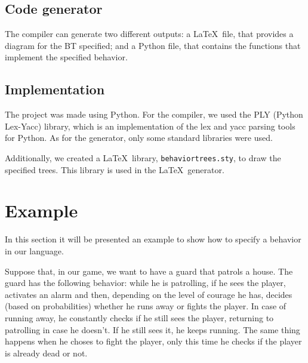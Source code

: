 \documentclass[a4paper,UKenglish,cleveref, autoref, thm-restate]{oasics-v2019}
\begin{document}
\subsection{Code generator}
The compiler can generate two different outputs: a \LaTeX\ file, that provides a diagram for the BT specified; and a Python file, that contains the functions that implement the specified behavior.


\subsection{Implementation}

The project was made using Python.
For the compiler, we used the PLY (Python Lex-Yacc) library, which is an implementation of the lex and yacc parsing tools for Python.
As for the generator, only some standard libraries were used.


Additionally, we created a \LaTeX\ library, \texttt{behaviortrees.sty}, to draw the specified trees. This library is used in the \LaTeX\ generator.

\section{Example}
\label{sec:example}
In this section it will be presented an example to show how to specify a behavior in our language.

Suppose that, in our game, we want to have a guard that patrols a house.
The guard has the following behavior: while he is patrolling, if he sees the player, activates an alarm and then, depending on the level of courage he has, decides (based on probabilities) whether he runs away or fights the player.
In case of running away, he constantly checks if he still sees the player, returning to patrolling in case he doesn't. If he still sees it, he keeps running.
The same thing happens when he choses to fight the player, only this time he checks if the player is already dead or not.
\end{document}
